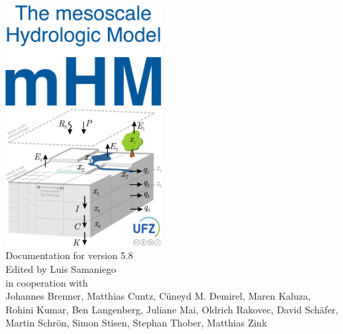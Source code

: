 \documentclass[twoside]{book}
\newcommand{\+}{\discretionary{\mbox{\scriptsize$\hookleftarrow$}}{}{}}
\begin{document}

\hypersetup{pageanchor=false,
             bookmarks=true,
             bookmarksnumbered=true,
             pdfencoding=unicode
            }
\begin{titlepage}
\vspace*{1.5cm}
\begin{center}%
\includegraphics[width=6.0cm]{../doc/figures/mHM_textlogo.pdf}\\

\vspace*{1cm}
\includegraphics[width=6.0cm]{../doc/figures/mhm5-logo.pdf}\\
\vspace*{1.5cm}
{\Large Documentation for version 5.8}\\
\vspace*{2.5cm}
{\large Edited by Luis Samaniego}\\
\vspace*{0.5cm}
{\large in cooperation with}\\
\vspace*{0.5cm}
{\large 
Johannes Brenner,
Matthias Cuntz,
C\"uneyd M. Demirel,
Maren Kaluza,\\[1ex]
Rohini Kumar,
Ben Langenberg, 
Juliane Mai, 
Oldrich Rakovec, 
David Sch\"{a}fer,\\[1.2ex]
Martin Schr\"{o}n,
Simon Stisen,
Stephan Thober,
Matthias Zink }\\
\vspace*{1.9cm}
\vspace*{0.75cm}
\end{center}
\end{titlepage}
\end{document}
